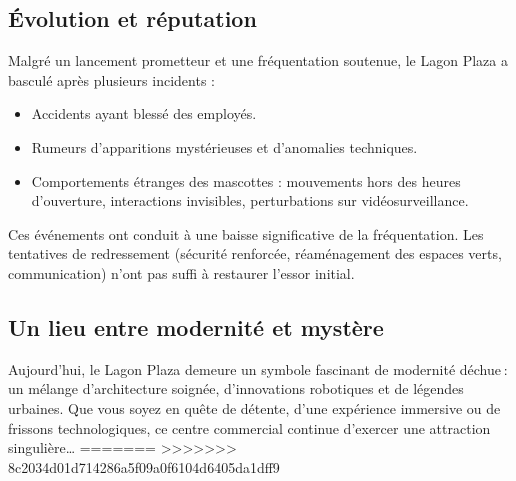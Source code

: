 \subsection{Évolution et réputation}
Malgré un lancement prometteur et une fréquentation soutenue, le Lagon Plaza a basculé après plusieurs incidents :
\begin{itemize}
  \item Accidents ayant blessé des employés.
  \item Rumeurs d’apparitions mystérieuses et d’anomalies techniques.
  \item Comportements étranges des mascottes : mouvements hors des heures d’ouverture, interactions invisibles, perturbations sur vidéosurveillance.
\end{itemize}
Ces événements ont conduit à une baisse significative de la fréquentation. Les tentatives de redressement (sécurité renforcée, réaménagement des espaces verts, communication) n’ont pas suffi à restaurer l’essor initial.

\subsection{Un lieu entre modernité et mystère}
Aujourd’hui, le Lagon Plaza demeure un symbole fascinant de modernité déchue : un mélange d’architecture soignée, d’innovations robotiques et de légendes urbaines. Que vous soyez en quête de détente, d’une expérience immersive ou de frissons technologiques, ce centre commercial continue d’exercer une attraction singulière…  
=======
>>>>>>> 8c2034d01d714286a5f09a0f6104d6405da1dff9
